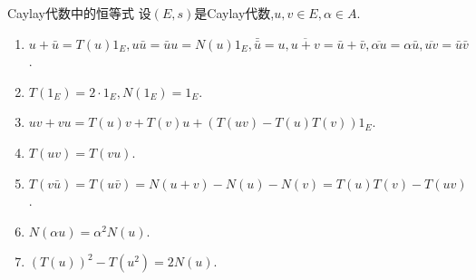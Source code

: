 \begin{proposition}{Caylay代数中的恒等式}{}
	设$\left(E,s\right)$是Caylay代数,$u,v\in E,\alpha\in A$.
	\begin{enumerate}
		\item $u+\bar{u}=T\left(u\right)1_{E},u\bar{u}=\bar{u}u=N\left(u\right)1_{E},\bar{\bar{u}}=u,\overline{u+v}=\bar{u}+\bar{v},\overline{\alpha u}=\alpha\bar{u},\overline{uv}=\bar{u}\bar{v}$.
		\item $T\left(1_{E}\right)=2\cdot 1_{E},N\left(1_{E}\right)=1_{E}$.
		\item $uv+vu=T\left(u\right)v+T\left(v\right)u+\left(T\left(uv\right)-T\left(u\right)T\left(v\right)\right)1_{E}$.
		\item $T\left(uv\right)=T\left(vu\right)$.
		\item $T\left(v\bar{u}\right)=T\left(u\bar{v}\right)=N\left(u+v\right)-N\left(u\right)-N\left(v\right)=T\left(u\right)T\left(v\right)-T\left(uv\right)$.
		\item $N\left(\alpha u\right)=\alpha^{2}N\left(u\right)$.
		\item $\left(T\left(u\right)\right)^{2}-T\left(u^{2}\right)=2N\left(u\right)$.
	\end{enumerate}
\end{proposition}








































